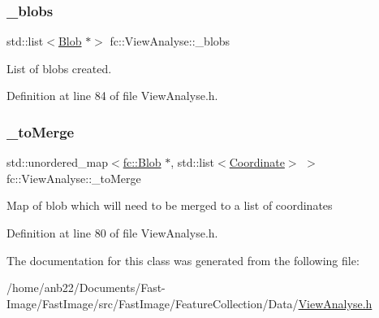 \subsubsection{\texorpdfstring{\+\_\+blobs}{\_blobs}}
{\footnotesize\ttfamily std\+::list$<$\hyperlink{classfc_1_1Blob}{Blob} $\ast$$>$ fc\+::\+View\+Analyse\+::\+\_\+blobs\hspace{0.3cm}{\ttfamily [private]}}



List of blobs created. 



Definition at line 84 of file View\+Analyse.\+h.

\mbox{\label{classfc_1_1ViewAnalyse_a426904a0e69addc711b90dbd288c0a00}} 
\subsubsection{\texorpdfstring{\+\_\+to\+Merge}{\_toMerge}}
{\footnotesize\ttfamily std\+::unordered\+\_\+map$<$\hyperlink{classfc_1_1Blob}{fc\+::\+Blob} $\ast$, std\+::list$<$\hyperlink{namespacefc_a7da125cb1e99553c27c07139ee8a62ca}{Coordinate}$>$ $>$ fc\+::\+View\+Analyse\+::\+\_\+to\+Merge\hspace{0.3cm}{\ttfamily [private]}}

Map of blob which will need to be merged to a list of coordinates 

Definition at line 80 of file View\+Analyse.\+h.



The documentation for this class was generated from the following file\+:\begin{DoxyCompactItemize}
\item 
/home/anb22/\+Documents/\+Fast-\/\+Image/\+Fast\+Image/src/\+Fast\+Image/\+Feature\+Collection/\+Data/\hyperlink{ViewAnalyse_8h}{View\+Analyse.\+h}\end{DoxyCompactItemize}
